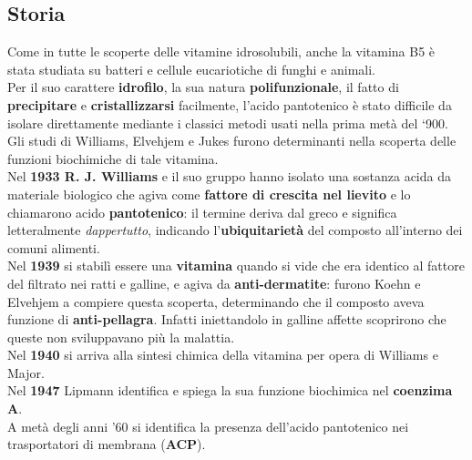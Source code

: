 \documentclass[a4paper, 12pt]{article}
\begin{document}
\subsection{Storia}
Come in tutte le scoperte delle vitamine idrosolubili, anche la vitamina B5 è stata studiata su batteri e cellule eucariotiche di funghi e animali.\\
Per il suo carattere \textbf{idrofilo}, la sua natura \textbf{polifunzionale}, il fatto di \textbf{precipitare} e \textbf{cristallizzarsi} facilmente, l’acido pantotenico è stato difficile da isolare direttamente mediante i classici metodi usati nella prima metà del ‘900.\\
Gli studi di Williams, Elvehjem e Jukes furono determinanti nella scoperta delle funzioni biochimiche di tale vitamina.\\
Nel \textbf{1933 R. J. Williams} e il suo gruppo hanno isolato una sostanza acida da materiale biologico che agiva come \textbf{fattore di crescita nel lievito} e lo chiamarono acido \textbf{pantotenico}: il termine deriva dal greco e significa letteralmente \textit{dappertutto}, indicando l'\textbf{ubiquitarietà} del composto all'interno dei comuni alimenti.\\
Nel \textbf{1939} si stabilì essere una \textbf{vitamina} quando si vide che era identico al fattore del filtrato nei ratti e galline, e agiva da \textbf{anti-dermatite}: furono Koehn e Elvehjem a compiere questa scoperta, determinando che il composto aveva funzione di \textbf{anti-pellagra}. Infatti iniettandolo in galline affette scoprirono che queste non sviluppavano più la malattia.\\
Nel \textbf{1940} si arriva alla sintesi chimica della vitamina per opera di Williams e Major.\\
Nel \textbf{1947} Lipmann identifica e spiega la sua funzione biochimica nel \textbf{coenzima A}.\\
A metà degli anni ’60 si identifica la presenza dell’acido pantotenico nei trasportatori di membrana (\textbf{ACP}).
\end{document}
